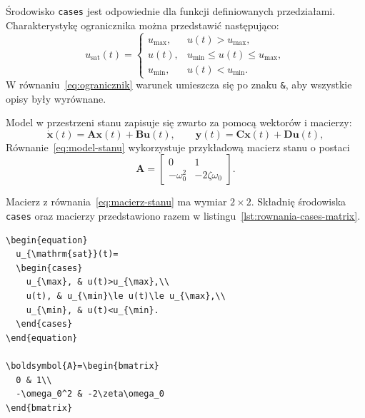 \section{}

Środowisko \texttt{cases} jest odpowiednie dla funkcji definiowanych przedziałami.
Charakterystykę ogranicznika można przedstawić następująco:
\begin{equation}
  u_{\mathrm{sat}}(t)=
  \begin{cases}
    u_{\max}, & u(t)>u_{\max},\\
    u(t), & u_{\min}\le u(t)\le u_{\max},\\
    u_{\min}, & u(t)<u_{\min}.
  \end{cases}
  \label{eq:ogranicznik}
\end{equation}
W równaniu~\ref{eq:ogranicznik} warunek umieszcza się po znaku \verb|&|, aby wszystkie opisy były wyrównane.

Model w przestrzeni stanu zapisuje się zwarto za pomocą wektorów i macierzy:
\begin{equation}
  \dot{\boldsymbol{x}}(t)
    = \boldsymbol{A}\boldsymbol{x}(t)+\boldsymbol{B}\boldsymbol{u}(t),
  \qquad
  \boldsymbol{y}(t)
    = \boldsymbol{C}\boldsymbol{x}(t)+\boldsymbol{D}\boldsymbol{u}(t),
  \label{eq:model-stanu}
\end{equation}
Równanie~\ref{eq:model-stanu} wykorzystuje przykładową macierz stanu o postaci
\begin{equation}
  \boldsymbol{A}=
  \begin{bmatrix}
    0 & 1\\
    -\omega_0^2 & -2\zeta\omega_0
  \end{bmatrix}.
  \label{eq:macierz-stanu}
\end{equation}

Macierz z równania~\ref{eq:macierz-stanu} ma wymiar $2\times2$. Składnię środowiska \texttt{cases} oraz macierzy przedstawiono razem
w listingu~\ref{lst:rownania-cases-matrix}.

\begin{lstlisting}[style=thesis,caption={Kod definicji przedziałowej i macierzy},label={lst:rownania-cases-matrix}]
\begin{equation}
  u_{\mathrm{sat}}(t)=
  \begin{cases}
    u_{\max}, & u(t)>u_{\max},\\
    u(t), & u_{\min}\le u(t)\le u_{\max},\\
    u_{\min}, & u(t)<u_{\min}.
  \end{cases}
\end{equation}

\boldsymbol{A}=\begin{bmatrix}
  0 & 1\\
  -\omega_0^2 & -2\zeta\omega_0
\end{bmatrix}
\end{lstlisting}

